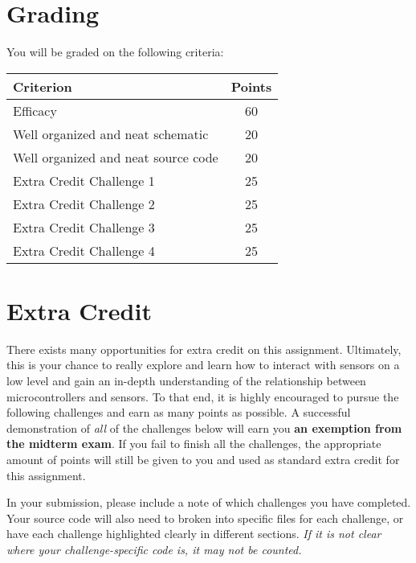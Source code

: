 \section*{Grading} 
You will be graded on the following criteria:
\begin{table}[h!]
    \begin{tabular}{l | c}
        \toprule
        Criterion & Points \\

        \midrule
        Efficacy & 60 \\
        Well organized and neat schematic & 20 \\
        Well organized and neat source code & 20 \\
        Extra Credit Challenge 1 \footnotemark & 25 \\
        Extra Credit Challenge 2 & 25 \\
        Extra Credit Challenge 3 & 25 \\
        Extra Credit Challenge 4 & 25 \\

        \bottomrule
    \end{tabular}
\end{table}

\section*{Extra Credit} 
There exists many opportunities for extra credit on this assignment. 
Ultimately, this is your chance to really explore and learn how to interact with sensors on a low level and gain an in-depth understanding of the relationship between microcontrollers and sensors.
To that end, it is highly encouraged to pursue the following challenges and earn as many points as possible.
A successful demonstration of \emph{all} of the challenges below will earn you \textbf{an exemption from the midterm exam}.
If you fail to finish all the challenges, the appropriate amount of points will still be given to you and used as standard extra credit for this assignment.

In your submission, please include a note of which challenges you have completed.
Your source code will also need to broken into specific files for each challenge, or have each challenge highlighted clearly in different sections.
\emph{If it is not clear where your challenge-specific code is, it may not be counted.}

